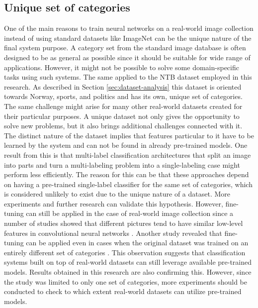 \subsection{Unique set of categories}
One of the main reasons to train neural networks on a real-world image collection instead of using standard datasets like ImageNet can be the unique nature of the final system purpose. A category set from the standard image database is often designed to be as general as possible since it should be suitable for wide range of applications. However, it might not be possible to solve some domain-specific tasks using such systems. The same applied to the NTB dataset employed in this research. As described in Section \ref{sec:dataset-analysis} this dataset is oriented towards Norway, sports, and politics and has its own, unique set of categories. The same challenge might arise for many other real-world datasets created for their particular purposes. A unique dataset not only gives the opportunity to solve new problems, but it also brings additional challenges connected with it. The distinct nature of the dataset implies that features particular to it have to be learned by the system and can not be found in already pre-trained models. One result from this is that multi-label classification architectures that split an image into parts and turn a multi-labeling problem into a single-labeling case might perform less efficiently. The reason for this can be that these approaches depend on having a pre-trained single-label classifier for the same set of categories, which is considered unlikely to exist due to the unique nature of a dataset. More experiments and further research can validate this hypothesis. However, fine-tuning can still be applied in the case of real-world image collection since a number of studies showed that different pictures tend to have similar low-level features in convolutional neural networks \cite{Pan2010TransferLearningSurvey, Oquab2014TransferringMidLevel}. Another study revealed that fine-tuning can be applied even in cases when the original dataset was trained on an entirely different set of categories \cite{Yosinski2014HowTransferable}. This observation suggests that classification systems built on top of real-world datasets can still leverage available pre-trained models. Results obtained in this research are also confirming this. However, since the study was limited to only one set of categories, more experiments should be conducted to check to which extent real-world datasets can utilize pre-trained models. 

